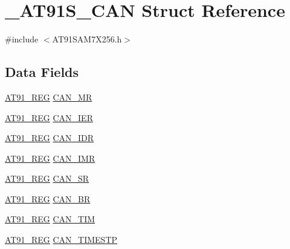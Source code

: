 \hypertarget{struct__AT91S__CAN}{\section{\-\_\-\-A\-T91\-S\-\_\-\-C\-A\-N Struct Reference}
\label{struct__AT91S__CAN}
}


{\ttfamily \#include $<$A\-T91\-S\-A\-M7\-X256.\-h$>$}

\subsection*{Data Fields}
\begin{DoxyCompactItemize}
\item 
\hyperlink{GCC_2ARM7__AT91SAM7S_2AT91SAM7X256_8h_a712ad5a1ac1bd02f3e95a7526c283ce1}{A\-T91\-\_\-\-R\-E\-G} \hyperlink{struct__AT91S__CAN_ac9b717e114de69702a2271f059b95efe}{C\-A\-N\-\_\-\-M\-R}
\item 
\hyperlink{GCC_2ARM7__AT91SAM7S_2AT91SAM7X256_8h_a712ad5a1ac1bd02f3e95a7526c283ce1}{A\-T91\-\_\-\-R\-E\-G} \hyperlink{struct__AT91S__CAN_a78d3123ccb970a71b6998653ccaa054e}{C\-A\-N\-\_\-\-I\-E\-R}
\item 
\hyperlink{GCC_2ARM7__AT91SAM7S_2AT91SAM7X256_8h_a712ad5a1ac1bd02f3e95a7526c283ce1}{A\-T91\-\_\-\-R\-E\-G} \hyperlink{struct__AT91S__CAN_a58fb5692831597863baf66ea4d18a931}{C\-A\-N\-\_\-\-I\-D\-R}
\item 
\hyperlink{GCC_2ARM7__AT91SAM7S_2AT91SAM7X256_8h_a712ad5a1ac1bd02f3e95a7526c283ce1}{A\-T91\-\_\-\-R\-E\-G} \hyperlink{struct__AT91S__CAN_a55c277bd6dac15055222d3066ef374eb}{C\-A\-N\-\_\-\-I\-M\-R}
\item 
\hyperlink{GCC_2ARM7__AT91SAM7S_2AT91SAM7X256_8h_a712ad5a1ac1bd02f3e95a7526c283ce1}{A\-T91\-\_\-\-R\-E\-G} \hyperlink{struct__AT91S__CAN_a406e82106f4111f374c2e021df6d1fb3}{C\-A\-N\-\_\-\-S\-R}
\item 
\hyperlink{GCC_2ARM7__AT91SAM7S_2AT91SAM7X256_8h_a712ad5a1ac1bd02f3e95a7526c283ce1}{A\-T91\-\_\-\-R\-E\-G} \hyperlink{struct__AT91S__CAN_a1af276558e1f9273eb9b1c8aa7a67838}{C\-A\-N\-\_\-\-B\-R}
\item 
\hyperlink{GCC_2ARM7__AT91SAM7S_2AT91SAM7X256_8h_a712ad5a1ac1bd02f3e95a7526c283ce1}{A\-T91\-\_\-\-R\-E\-G} \hyperlink{struct__AT91S__CAN_a76dcdcbdaa00f9336e18b924f4777f51}{C\-A\-N\-\_\-\-T\-I\-M}
\item 
\hyperlink{GCC_2ARM7__AT91SAM7S_2AT91SAM7X256_8h_a712ad5a1ac1bd02f3e95a7526c283ce1}{A\-T91\-\_\-\-R\-E\-G} \hyperlink{struct__AT91S__CAN_a1811dcbae4b545538124651a67e2c3e5}{C\-A\-N\-\_\-\-T\-I\-M\-E\-S\-T\-P}

\end{DoxyCompactItemize}
